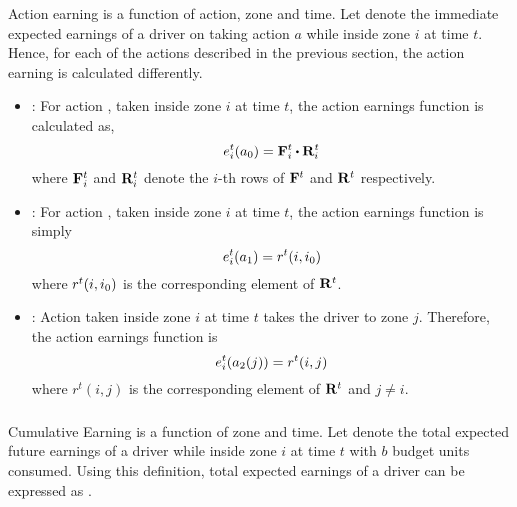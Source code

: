Action earning is a function of action, zone and time. Let {} denote the immediate expected earnings of a driver 
on taking action $a$ while inside zone $i$ at time $t$. Hence, for each of the actions described in the previous section, the
action earning is calculated differently.

\begin{itemize}
	\item {\getpassenger} : For action {\getpassengeraction}, taken inside zone $i$ at time $t$, the action earnings function
	is calculated as,
	\begin{equation}
	\actionearning{i}{t}{a_0} = \empiricaltransitionmatrix_{i}^{t} \bigcdot \rewardsmatrix_{i}^{t}
	\end{equation}
	where ${\mathbf{F}}_{i}^{t}$ and ${\mathbf{R}}_{i}^{t}$ denote the $i$-th rows of ${\mathbf{F}}^{t}$ and ${\mathbf{R}}^{t}$ respectively. \\

	\item {\gohome} : For action {\gohomeaction}, taken inside zone $i$ at time $t$, the action earnings function is simply
	\begin{equation}
	e_{i}^{t}({a_1}) = r^t(i,{i_0})
	\end{equation}
	where $r^t(i,{i_0})$ is the corresponding element of ${\mathbf{R}}^{t}$. \\

	\item {\relocate} : Action {\relocateaction} taken inside zone $i$ at time $t$ takes the driver to zone $j$. Therefore, the action earnings function is
	\begin{equation}
	e_{i}^{t}({a_2(j)}) = r^t(i,j)
	\end{equation}
	where $r^t(i,j)$ is the corresponding element of ${\mathbf{R}}^{t}$ and $j \neq i$. \\
\end{itemize}

\subsubsection{}

Cumulative Earning is a function of zone and time. Let {} denote the total expected future earnings of a driver
while inside zone $i$ at time $t$ with $b$ budget units consumed. Using this definition, total expected earnings of a driver can be expressed
as {}.

